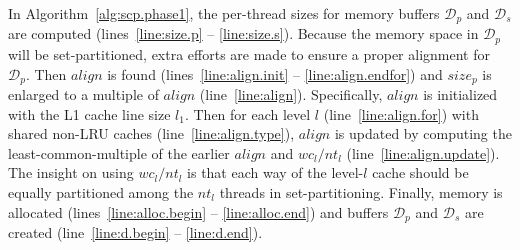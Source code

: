 In Algorithm~\ref{alg:scp.phase1},
the per-thread sizes for memory buffers $\mathcal{D}_p$ and
$\mathcal{D}_s$ are computed
(lines~\ref{line:size.p} -- \ref{line:size.s}).
Because the memory space in $\mathcal{D}_p$ will be set-partitioned,
extra efforts are made to ensure a proper alignment for $\mathcal{D}_p$.
Then $align$ is found
(lines~\ref{line:align.init} -- \ref{line:align.endfor}) 
and $size_p$ is enlarged to a multiple of $align$ (line~\ref{line:align}).
Specifically,
$align$ is initialized with the L1 cache line size $l_1$.
Then for each level $l$ (line~\ref{line:align.for})
with shared non-LRU caches (line~\ref{line:align.type}),
$align$ is updated by computing the least-common-multiple of
the earlier $align$ and $wc_l/nt_l$ (line~\ref{line:align.update}).
The insight on using $wc_l/nt_l$ is that
each way of the level-$l$ cache should be
equally partitioned among the $nt_l$ threads
in set-partitioning.
Finally, memory is allocated (lines~\ref{line:alloc.begin} -- \ref{line:alloc.end})
and buffers $\mathcal{D}_p$ and $\mathcal{D}_s$
are created (line~\ref{line:d.begin} -- \ref{line:d.end}).

